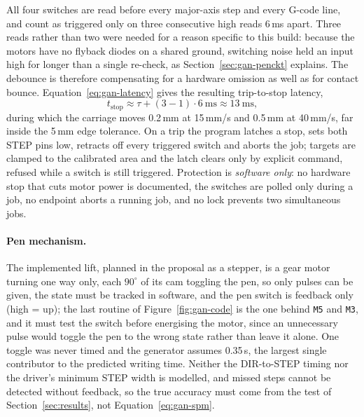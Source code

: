 All four switches are read before every major-axis step and every G-code line, and count as triggered only on three consecutive high reads 6\,ms apart. Three reads rather than two were needed for a reason specific to this build: because the motors have no flyback diodes on a shared ground, switching noise held an input high for longer than a single re-check, as Section~\ref{sec:gan-penckt} explains. The debounce is therefore compensating for a hardware omission as well as for contact bounce. Equation~\ref{eq:gan-latency} gives the resulting trip-to-stop latency,
\begin{equation}
t_{\mathrm{stop}}\approx\tau+(3-1)\cdot6\ \mathrm{ms}\approx13\ \mathrm{ms},
\label{eq:gan-latency}
\end{equation}
during which the carriage moves 0.2\,mm at 15\,mm/s and 0.5\,mm at 40\,mm/s, far inside the 5\,mm edge tolerance. On a trip the program latches a stop, sets both STEP pins low, retracts off every triggered switch and aborts the job; targets are clamped to the calibrated area and the latch clears only by explicit command, refused while a switch is still triggered. Protection is \emph{software only}: no hardware stop that cuts motor power is documented, the switches are polled only during a job, no endpoint aborts a running job, and no lock prevents two simultaneous jobs.

\paragraph{Pen mechanism.}
\label{sec:gan-pen}
The implemented lift, planned in the proposal as a stepper, is a gear motor turning one way only, each $90^\circ$ of its cam toggling the pen, so only pulses can be given, the state must be tracked in software, and the pen switch is feedback only (high = up); the last routine of Figure~\ref{fig:gan-code} is the one behind \texttt{M5} and \texttt{M3}, and it must test the switch before energising the motor, since an unnecessary pulse would toggle the pen to the wrong state rather than leave it alone. One toggle was never timed and the generator assumes 0.35\,s, the largest single contributor to the predicted writing time. Neither the DIR-to-STEP timing nor the driver's minimum STEP width is modelled, and missed steps cannot be detected without feedback, so the true accuracy must come from the test of Section~\ref{sec:results}, not Equation~\ref{eq:gan-spm}.

\endgroup
